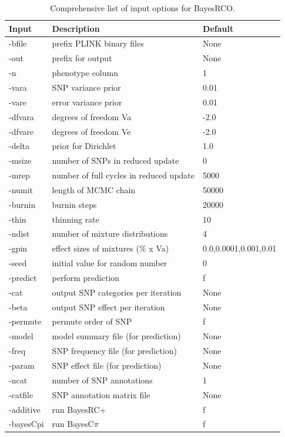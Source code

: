 \documentclass{ol-softwaremanual}
\begin{document}
\begin{table}[h!]
    \centering
    \begin{tabular}{|l|l|l|}
    \hline
      \textbf{Input} & \textbf{Description} &\textbf{Default} \\ 
      \hline
      \hline
-bfile & prefix PLINK binary files & None \\
-out &prefix for output& None \\
-n&phenotype column& 1 \\
-vara&SNP variance prior&0.01\\
-vare&error variance prior&0.01\\
-dfvara&degrees of freedom Va &-2.0\\
-dfvare&degrees of freedom Ve&-2.0\\
-delta&prior for Dirichlet&1.0\\
-msize&number of SNPs in reduced update&0\\
-mrep&number of full cycles in reduced update&5000\\
-numit&length of MCMC chain&50000\\
-burnin&burnin steps&20000\\
-thin&thinning rate&10\\
-ndist&number of mixture distributions&4\\
-gpin&effect sizes of mixtures (\% x Va)& 0.0,0.0001,0.001,0.01\\
-seed&initial value for random number&0\\
-predict&perform prediction&f\\
-cat&output SNP categories per iteration & None\\
-beta&output SNP effect per iteration&None\\
-permute&permute order of SNP&f\\
-model&model summary file (for prediction) & None\\
-freq&SNP frequency file (for prediction)&None\\
-param&SNP effect file (for prediction) & None\\
-ncat&number of SNP annotations&1\\
-catfile&SNP annotation matrix file& None\\
-additive&run BayesRC+&f\\
-bayesCpi&run BayesC$\pi$&f\\
\hline
    \end{tabular}
    \caption{Comprehensive list of input options for BayesRCO.\label{tab:options}}
\end{table}
\end{document}
